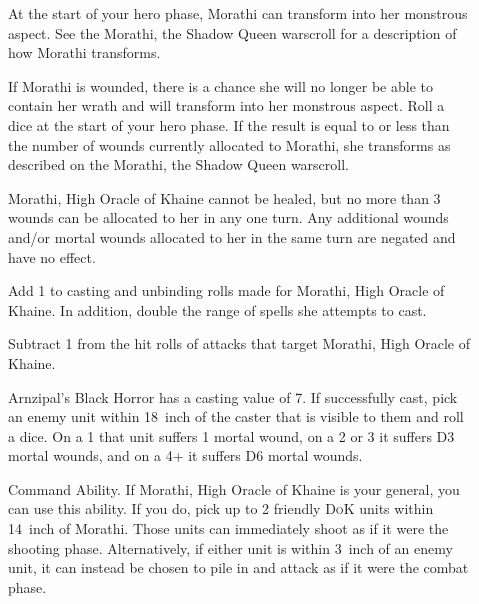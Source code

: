 \begin{description}
    \item [] At the
        start of your hero phase, Morathi can transform into her monstrous
        aspect. See the Morathi, the Shadow Queen warscroll for
        a description of how Morathi transforms.
    \item [] If Morathi is
        wounded, there is a chance she will no longer be able to contain her
        wrath and will transform into her monstrous aspect. Roll a dice at the
        start of your hero phase. If the result is equal to or less than the
        number of wounds currently allocated to Morathi, she transforms as
        described on the Morathi, the Shadow Queen warscroll.
    \item []
        Morathi, High Oracle of Khaine cannot be healed, but no more than
        3 wounds can be allocated to her in any one turn. Any additional wounds
        and/or mortal wounds allocated to her in the same turn are negated and
        have no effect.
    \item [] Add 1 to casting and
        unbinding rolls made for Morathi, High Oracle of Khaine. In addition,
        double the range of spells she attempts to cast.
    \item [] Subtract 1 from the
        hit rolls of attacks that target Morathi, High Oracle of Khaine.
    \item []
        Arnzipal's Black Horror has a casting value of 7. If successfully cast,
        pick an enemy unit within 18~inch of the caster that is visible to them
        and roll a dice. On a 1 that unit suffers 1 mortal wound, on a 2 or
        3 it suffers D3 mortal wounds, and on a 4+ it suffers D6 mortal
        wounds.
    \item []
        Command Ability. If Morathi, High Oracle of Khaine is your general, you
        can use this ability. If you do, pick up to 2 friendly \textsc{DoK}
        units within 14~inch of Morathi. Those units can immediately shoot as
        if it were the shooting phase. Alternatively, if either unit is within
        3~inch of an enemy unit, it can instead be chosen to pile in and attack
        as if it were the combat phase.
\end{description}

